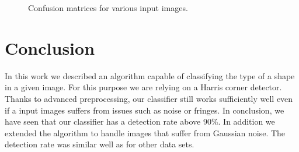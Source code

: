 \documentclass[conference]{IEEEtran}
\begin{document}
\begin{figure}[ht!]%
\centering
{}
\caption{Confusion matrices for various input images.}
\label{fig:confusion_matrices}
\end{figure}

\section{Conclusion}
In this work we described an algorithm capable of classifying the type of a shape in a given image. For this purpose we are relying on a Harris corner detector. 
Thanks to advanced preprocessing, our classifier still works sufficiently well even if a input images suffers from issues such as noise or fringes. 
In conclusion, we have seen that our classifier has a detection rate above 90\%. 
In addition we extended the algorithm to handle images that suffer from Gaussian noise. 
The detection rate was similar well as for other data sets.
\end{document}
